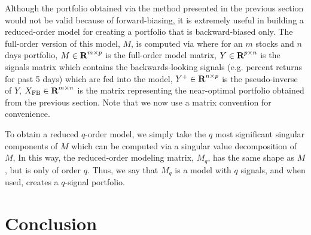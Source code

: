 \documentclass{article}
\begin{document}
    Although the portfolio obtained 
        via the method presented in the previous section
        would not be valid because of forward-biasing,
        it is extremely useful in building a reduced-order model
        for creating a portfolio that is backward-biased only.
    The full-order version of this model, $M$, is computed via
    where for an $m$ stocks and $n$ days portfolio,
        \BI $M \in {\mbox{\bf R}}^{m \times p}$ is the full-order model matrix,
        \I  $Y \in {\mbox{\bf R}}^{p \times n}$ is the signals matrix 
            which contains the backwards-looking signals 
            (e.g. percent returns for past 5 days)
            which are fed into the model,
        \I  $Y^+ \in {\mbox{\bf R}}^{n \times p}$ is the pseudo-inverse of $Y$,
        \I  $X_\text{FB} \in {\mbox{\bf R}}^{m \times n}$ is the matrix representing 
            the near-optimal portfolio obtained from the previous section.
            Note that we now use a matrix convention for convenience. \EI

    To obtain a reduced $q$-order model, 
        we simply take the $q$ most significant singular components of $M$
        which can be computed via a singular value decomposition of $M$,
    In this way, the reduced-order modeling matrix, $M_q$,
        has the same shape as $M$, but is only of order $q$.
    Thus, we say that $M_q$ is a model with $q$ signals,
        and when used, creates a $q$-signal portfolio.

\section{Conclusion}
    
\end{document}
